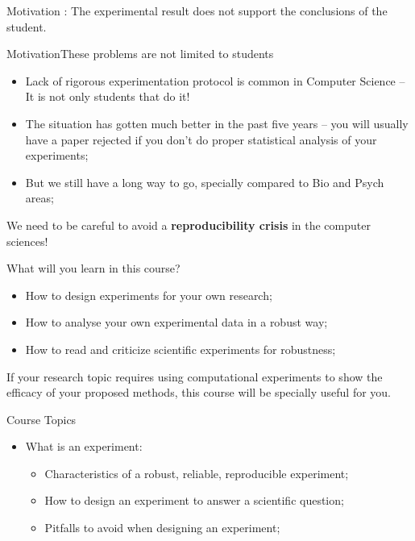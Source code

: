 \documentclass{beamer}
\begin{document}
\begin{CJK}{UTF8}{ipxm}
\begin{frame}{Motivation}
  : The experimental result does not support the conclusions of the student.
\end{frame}

\begin{frame}{Motivation}{These problems are not limited to students}

  \begin{itemize}
    \item Lack of rigorous experimentation protocol is common in Computer Science -- It is not only students that do it!
    \bigskip

    \item The situation has gotten much better in the past five years -- you will usually have a paper rejected if you don't do proper statistical analysis of your experiments;
    \bigskip

    \item But we still have a long way to go, specially compared to Bio and Psych areas;
  \end{itemize}

  \begin{block}{}
    We need to be careful to avoid a {\bf reproducibility crisis} in the computer sciences!
  \end{block}
\end{frame}

\begin{frame}{What will you learn in this course?}
  \begin{itemize}
    \item How to design experiments for your own research;\bigskip

    \item How to analyse your own experimental data in a robust way;\bigskip

    \item How to read and criticize scientific experiments for robustness;\bigskip
  \end{itemize}
  \bigskip

  If your research topic requires using computational experiments to show the efficacy of your proposed methods, this course will be specially useful for you.
\end{frame}
\begin{frame}{Course Topics}
  \begin{itemize}

    \item What is an experiment:
    \begin{itemize}
      \item Characteristics of a robust, reliable, reproducible experiment;
      \item How to design an experiment to answer a scientific question;
      \item Pitfalls to avoid when designing an experiment;
    \end{itemize}\bigskip


\end{itemize}
\end{frame}
\end{CJK}
\end{document}
